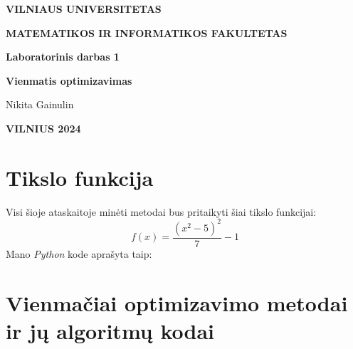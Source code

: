\documentclass{article}
\begin{document}
\newlength{\mywidth}
\settowidth{\mywidth}{Darbo vadovas:}
\begin{titlepage}
    \vskip 20pt
    \centerline{\bf \large VILNIAUS UNIVERSITETAS}
    \bigskip
    \centerline{\large \textbf{MATEMATIKOS IR INFORMATIKOS FAKULTETAS}}
    \vskip 120pt
    \centerline{\bf \Large \textbf{Laboratorinis darbas 1}}
    \vskip 50pt
    \begin{center}
        {\bf \LARGE Vienmatis optimizavimas}
    \end{center}
    \bigskip
    \bigskip
    \centerline{\Large Nikita Gainulin}
    \vskip 90pt
    \vskip 200pt
    \centerline{\large \textbf{VILNIUS 2024}}
\end{titlepage}

\tableofcontents

\clearpage
\section{Tikslo funkcija}
Visi šioje ataskaitoje minėti metodai bus pritaikyti šiai tikslo funkcijai:
\begin{equation}\label{eq:1}
    f(x) = \frac{(x^2-5)^2}{7}-1
\end{equation}
Mano \textit{Python} kode aprašyta taip:

\section{Vienmačiai optimizavimo metodai ir jų algoritmų kodai}
\end{document}
